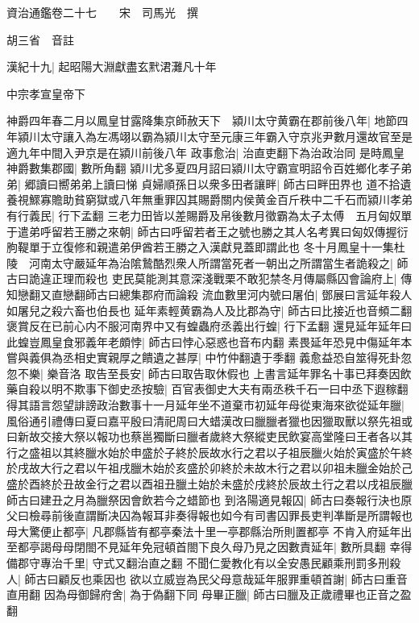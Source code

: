 資治通鑑卷二十七　　宋　司馬光　撰

胡三省　音註

漢紀十九|{
	起昭陽大淵獻盡玄黓涒灘凡十年}


中宗孝宣皇帝下

神爵四年春二月以鳳皇甘露降集京師赦天下　潁川太守黄霸在郡前後八年|{
	地節四年潁川太守讓入為左馮翊以霸為潁川太守至元康三年霸入守京兆尹數月還故官至是適九年中間入尹京是在潁川前後八年}
政事愈治|{
	治直吏翻下為治政治同}
是時鳳皇神爵數集郡國|{
	數所角翻}
潁川尤多夏四月詔曰潁川太守霸宣明詔令百姓鄉化孝子弟弟|{
	郷讀曰嚮弟弟上讀曰悌}
貞婦順孫日以衆多田者讓畔|{
	師古曰畔田界也}
道不拾遺養視鰥寡贍助貧窮獄或八年無重罪囚其賜爵關内侯黄金百斤秩中二千石而潁川孝弟有行義民|{
	行下孟翻}
三老力田皆以差賜爵及帛後數月徵霸為太子太傅　五月匈奴單于遣弟呼留若王勝之來朝|{
	師古曰呼留若者王之號也勝之其人名考異曰匈奴傳握衍朐鞮單于立復修和親遣弟伊酋若王勝之入漢獻見蓋即謂此也}
冬十月鳳皇十一集杜陵　河南太守嚴延年為治隂鷙酷烈衆人所謂當死者一朝出之所謂當生者詭殺之|{
	師古曰詭違正理而殺也}
吏民莫能測其意深淺戰栗不敢犯禁冬月傳屬縣囚會論府上|{
	傳知戀翻又直戀翻師古曰總集郡府而論殺}
流血數里河内號曰屠伯|{
	鄧展曰言延年殺人如屠兒之殺六畜也伯長也}
延年素輕黄霸為人及比郡為守|{
	師古曰比接近也音頻二翻}
褒賞反在已前心内不服河南界中又有蝗蟲府丞義出行蝗|{
	行下孟翻}
還見延年延年曰此蝗豈鳳皇食邪義年老頗悖|{
	師古曰悖心惡惑也音布内翻}
素畏延年恐見中傷延年本嘗與義俱為丞相史實親厚之饋遺之甚厚|{
	中竹仲翻遺于季翻}
義愈益恐自筮得死卦忽忽不樂|{
	樂音洛}
取告至長安|{
	師古曰取告取休假也}
上書言延年罪名十事已拜奏因飲藥自殺以明不欺事下御史丞按驗|{
	百官表御史大夫有兩丞秩千石一曰中丞下遐稼翻}
得其語言怨望誹謗政治數事十一月延年坐不道棄市初延年母從東海來欲從延年臘|{
	風俗通引禮傳曰夏曰嘉平殷曰清祀周曰大蜡漢改曰臘臘者獵也因獵取獸以祭先祖或曰新故交接大祭以報功也蔡邕獨斷曰臘者歲終大祭縱吏民飲宴高堂隆曰王者各以其行之盛祖以其終臘水始於申盛於子終於辰故水行之君以子祖辰臘火始於寅盛於午終於戌故大行之君以午祖戌臘木始於亥盛於卯終於未故木行之君以卯祖未臘金始於己盛於酉終於丑故金行之君以酉祖丑臘土始於未盛於戌終於辰故土行之君以戌祖辰臘師古曰建丑之月為臘祭因會飲若今之蜡節也}
到洛陽適見報囚|{
	師古曰奏報行決也原父曰檢尋前後直謂斷决囚為報耳非奏得報也如今有司書囚罪長吏判凖斷是所謂報也}
母大驚便止都亭|{
	凡郡縣皆有都亭秦法十里一亭郡縣治所則置都亭}
不肯入府延年出至都亭謁母母閉閤不見延年免冠頓首閤下良久母乃見之因數責延年|{
	數所具翻}
幸得備郡守專治千里|{
	守式又翻治直之翻}
不聞仁愛教化有以全安愚民顧乘刑罰多刑殺人|{
	師古曰顧反也乘因也}
欲以立威豈為民父母意哉延年服罪重頓首謝|{
	師古曰重音直用翻}
因為母御歸府舍|{
	為于偽翻下同}
母畢正臘|{
	師古曰臘及正歲禮畢也正音之盈翻}
